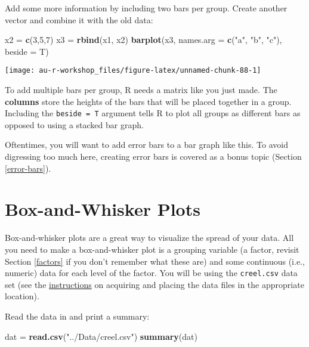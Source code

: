 \documentclass[]{book}
\newenvironment{Shaded}{\begin{snugshade}}{\end{snugshade}}
\newcommand{\KeywordTok}[1]{\textcolor[rgb]{0.13,0.29,0.53}{\textbf{#1}}}
\newcommand{\DataTypeTok}[1]{\textcolor[rgb]{0.13,0.29,0.53}{#1}}
\newcommand{\DecValTok}[1]{\textcolor[rgb]{0.00,0.00,0.81}{#1}}
\newcommand{\StringTok}[1]{\textcolor[rgb]{0.31,0.60,0.02}{#1}}
\newcommand{\NormalTok}[1]{#1}
\theoremstyle{definition}
\theoremstyle{definition}
\theoremstyle{definition}
\theoremstyle{remark}
\begin{document}
Add some more information by including two bars per group. Create
another vector and combine it with the old data:

\begin{Shaded}
\begin{Highlighting}[]
\NormalTok{x2 =}\StringTok{ }\KeywordTok{c}\NormalTok{(}\DecValTok{3}\NormalTok{,}\DecValTok{5}\NormalTok{,}\DecValTok{7}\NormalTok{)}
\NormalTok{x3 =}\StringTok{ }\KeywordTok{rbind}\NormalTok{(x1, x2)}
\KeywordTok{barplot}\NormalTok{(x3, }\DataTypeTok{names.arg =} \KeywordTok{c}\NormalTok{(}\StringTok{"a"}\NormalTok{, }\StringTok{"b"}\NormalTok{, }\StringTok{"c"}\NormalTok{), }\DataTypeTok{beside =}\NormalTok{ T)}
\end{Highlighting}
\end{Shaded}

\begin{center}\texttt{[image: au-r-workshop\_files/figure-latex/unnamed-chunk-88-1]} \end{center}

To add multiple bars per group, R needs a matrix like you just made. The
\textbf{columns} store the heights of the bars that will be placed
together in a group. Including the \texttt{beside\ =\ T} argument tells
R to plot all groups as different bars as opposed to using a stacked bar
graph.

Oftentimes, you will want to add error bars to a bar graph like this. To
avoid digressing too much here, creating error bars is covered as a
bonus topic (Section \ref{error-bars}).

\section{Box-and-Whisker Plots}\label{box-whisker}

Box-and-whisker plots are a great way to visualize the spread of your
data. All you need to make a box-and-whisker plot is a grouping variable
(a factor, revisit Section \ref{factors} if you don't remember what
these are) and some continuous (i.e., numeric) data for each level of
the factor. You will be using the \texttt{creel.csv} data set (see the
\protect\hyperlink{data-sets}{instructions} on acquiring and placing the
data files in the appropriate location).

Read the data in and print a summary:

\begin{Shaded}
\begin{Highlighting}[]
\NormalTok{dat =}\StringTok{ }\KeywordTok{read.csv}\NormalTok{(}\StringTok{"../Data/creel.csv"}\NormalTok{)}
\KeywordTok{summary}\NormalTok{(dat)}
\end{Highlighting}
\end{Shaded}
\end{document}

